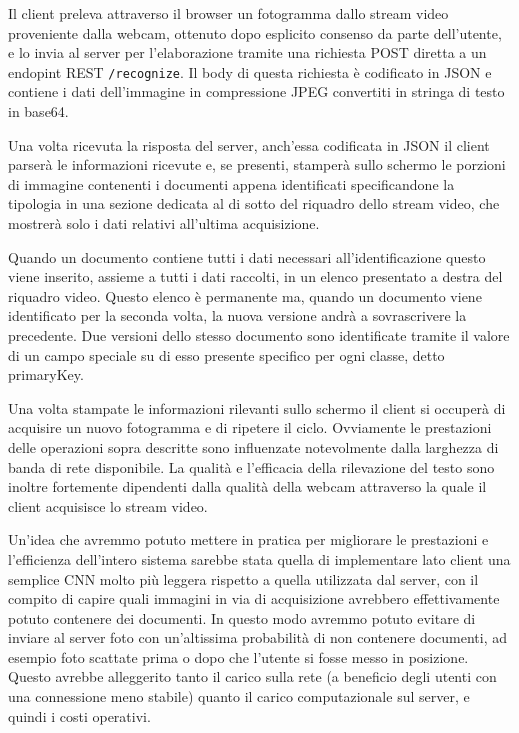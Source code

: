 \documentclass[12pt,a4paper]{article}
\begin{document}
Il client preleva attraverso il browser un fotogramma dallo stream video
proveniente dalla webcam, ottenuto dopo esplicito consenso da parte
dell'utente, e lo invia al server per l'elaborazione tramite una
richiesta POST diretta a un endopint REST \texttt{/recognize}. Il body
di questa richiesta è codificato in JSON e contiene i dati dell'immagine
in compressione JPEG convertiti in stringa di testo in base64.

Una volta ricevuta la risposta del server, anch'essa codificata in JSON
il client parserà le informazioni ricevute e, se presenti, stamperà
sullo schermo le porzioni di immagine contenenti i documenti appena
identificati specificandone la tipologia in una sezione dedicata al di
sotto del riquadro dello stream video, che mostrerà solo i dati relativi
all'ultima acquisizione.

Quando un documento contiene tutti i dati necessari all'identificazione
questo viene inserito, assieme a tutti i dati raccolti, in un elenco
presentato a destra del riquadro video. Questo elenco è permanente ma,
quando un documento viene identificato per la seconda volta, la nuova
versione andrà a sovrascrivere la precedente. Due versioni dello stesso
documento sono identificate tramite il valore di un campo speciale su di
esso presente specifico per ogni classe, detto primaryKey.

Una volta stampate le informazioni rilevanti sullo schermo il client si
occuperà di acquisire un nuovo fotogramma e di ripetere il ciclo.
Ovviamente le prestazioni delle operazioni sopra descritte sono
influenzate notevolmente dalla larghezza di banda di rete disponibile.
La qualità e l'efficacia della rilevazione del testo sono inoltre
fortemente dipendenti dalla qualità della webcam attraverso la quale il
client acquisisce lo stream video.

Un'idea che avremmo potuto mettere in pratica per migliorare le
prestazioni e l'efficienza dell'intero sistema sarebbe stata quella di
implementare lato client una semplice CNN molto più leggera rispetto a
quella utilizzata dal server, con il compito di capire quali immagini in
via di acquisizione avrebbero effettivamente potuto contenere dei
documenti. In questo modo avremmo potuto evitare di inviare al server
foto con un'altissima probabilità di non contenere documenti, ad esempio
foto scattate prima o dopo che l'utente si fosse messo in posizione.
Questo avrebbe alleggerito tanto il carico sulla rete (a beneficio degli
utenti con una connessione meno stabile) quanto il carico computazionale
sul server, e quindi i costi operativi.
\end{document}
